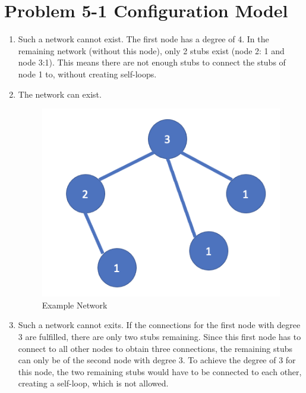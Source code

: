 \section{Problem 5-1 Configuration Model}



\begin{enumerate}
	\item Such a network cannot exist. The first node has a degree of 4.  In the remaining network (without this node), only 2 stubs exist (node 2: 1 and node 3:1).  This means there are not enough stubs to connect the stubs of node 1 to,  without creating self-loops.
	
	\item The network can exist.
	\begin{figure}[h]
		\centering
		\includegraphics[width=0.9\linewidth]{images/pic1.png}
		\caption{Example Network}
		\label{distribution}
	\end{figure}
	
	\item Such a network cannot exits.  If the connections for the first node with degree 3 are fulfilled,  there are only two stubs remaining.  Since this first node has to connect to all other nodes to obtain three connections,  the remaining stubs can only be of the second node with degree 3.  To achieve the degree of 3 for this node,  the two remaining stubs would have to be connected to each other,  creating a self-loop,  which is not allowed.
\end{enumerate}